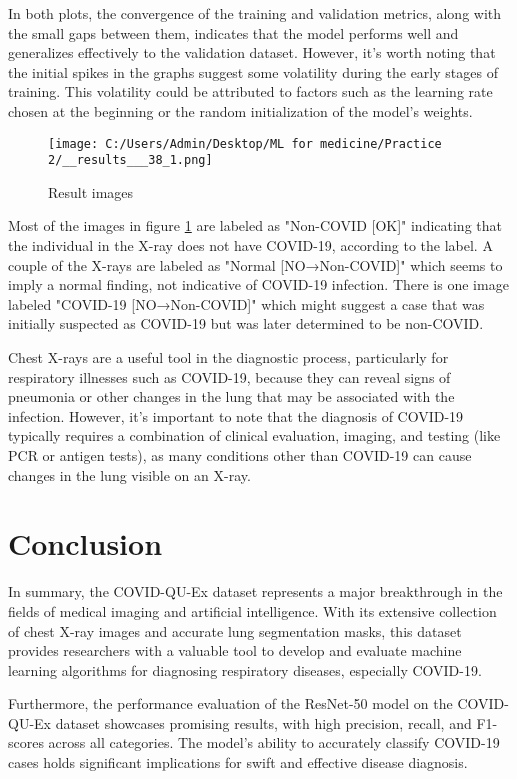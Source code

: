 \documentclass{article}
\begin{document}
In both plots, the convergence of the training and validation metrics, along with the small gaps between them, indicates that the model performs well and generalizes effectively to the validation dataset. However, it's worth noting that the initial spikes in the graphs suggest some volatility during the early stages of training. This volatility could be attributed to factors such as the learning rate chosen at the beginning or the random initialization of the model's weights.

\begin{figure}[htbp]
    \centering
    \texttt{[image: C:/Users/Admin/Desktop/ML for medicine/Practice 2/\_\_results\_\_\_38\_1.png]}
    \caption{Result images}
    \label{fig:result}
\end{figure}

Most of the images in figure \ref{fig:result} are labeled as "Non-COVID [OK]" indicating that the individual in the X-ray does not have COVID-19, according to the label. A couple of the X-rays are labeled as "Normal [NO→Non-COVID]" which seems to imply a normal finding, not indicative of COVID-19 infection. There is one image labeled "COVID-19 [NO→Non-COVID]" which might suggest a case that was initially suspected as COVID-19 but was later determined to be non-COVID.

Chest X-rays are a useful tool in the diagnostic process, particularly for respiratory illnesses such as COVID-19, because they can reveal signs of pneumonia or other changes in the lung that may be associated with the infection. However, it's important to note that the diagnosis of COVID-19 typically requires a combination of clinical evaluation, imaging, and testing (like PCR or antigen tests), as many conditions other than COVID-19 can cause changes in the lung visible on an X-ray.

\newpage

\section{Conclusion}
In summary, the COVID-QU-Ex dataset represents a major breakthrough in the fields of medical imaging and artificial intelligence. With its extensive collection of chest X-ray images and accurate lung segmentation masks, this dataset provides researchers with a valuable tool to develop and evaluate machine learning algorithms for diagnosing respiratory diseases, especially COVID-19.

Furthermore, the performance evaluation of the ResNet-50 model on the COVID-QU-Ex dataset showcases promising results, with high precision, recall, and F1-scores across all categories. The model's ability to accurately classify COVID-19 cases holds significant implications for swift and effective disease diagnosis.
\end{document}
